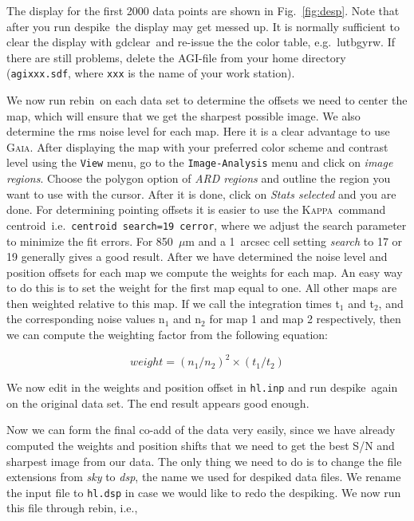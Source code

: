 \documentclass[twoside,11pt]{article}
\newcommand{\Kappa}{\xref{\textsc{Kappa}}{sun95}{}}
\newcommand{\gaia}{\xref{\textsc{Gaia}}{sun214}{}}
\newcommand{\agi}{\xref{AGI}{sun48}{}}
\newcommand{\task}[1]{\textsf{#1}}
\newcommand{\rebin}{\xref{\task{rebin}}{sun216}{REBIN}}
\newcommand{\desp}{\xref{\task{despike}}{sun216}{DESPIKE}}
\newcommand{\centroid}{\xref{\task{centroid}}{sun95}{CENTROID}}
\newcommand{\gdclear}{\xref{\task{gdclear}}{sun95}{GDCLEAR}}
\newcommand{\lutbgyrw}{\xref{\task{lutbgyrw}}{sun95}{LUTBGYRW}}
\newcommand{\xref}[3]{#1}
\renewcommand{\_}{\texttt{\symbol{95}}}
\begin{document}
The display for the first 2000 data points are shown in Fig.\ \ref{fig:desp}.
Note that after you run \desp\ the display may get messed up.  It is normally
sufficient to clear the display with \gdclear\ and re-issue the the color
table, e.g.\ \lutbgyrw.  If there are still problems, delete the \agi-file
from your home directory (\texttt{agi\_xxx.sdf}, where \texttt{xxx} is the
name of your work station).


We now run \rebin\ on each data set to determine the offsets we need to center
the map, which will ensure that we get the sharpest possible image.  We also
determine the rms noise level for each map.  Here it is a clear advantage to
use \gaia.  After displaying the map with your preferred color scheme and
contrast level using the \texttt{View} menu, go to the \texttt{Image-Analysis}
menu and click on \textit{image regions}.  Choose the polygon option of
\textit{ARD regions} and outline the region you want to use with the cursor.
After it is done, click on \textit{Stats selected} and you are done.  For
determining pointing offsets it is easier to use the \Kappa\ command
\centroid\ i.e.\ \texttt{centroid search=19 cerror}, where we adjust the
search parameter to minimize the fit errors.  For 850~$\mu$m and a 1~arcsec
cell setting \textit{search} to 17 or 19 generally gives a good result.  After
we have determined the noise level and position offsets for each map we
compute the weights for each map.  An easy way to do this is to set the weight
for the first map equal to one.  All other maps are then weighted relative to
this map.  If we call the integration times t$_1$ and t$_2$, and the
corresponding noise values n$_1$ and n$_2$ for map 1 and map 2 respectively,
then we can compute the weighting factor from the following equation:

\begin{equation} weight = (n_1/n_2)^2\times(t_1/t_2) \end{equation}

\noindent
We now edit in the weights and position offset in \texttt{hl.inp} and
run \desp\ again on the original data set.  The end result appears
good enough.

Now we can form the final co-add of the data very easily, since we
have already computed the weights and position shifts that we need to
get the best S/N and sharpest image from our data.  The only thing we
need to do is to change the file extensions from {\it sky} to {\it
dsp}, the name we used for despiked data files.  We rename the input
file to \texttt{hl.dsp} in case we would like to redo the despiking. 
We now run this file through \rebin, i.e.,
\end{document}

